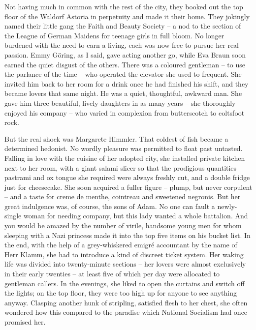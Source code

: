 Not having much in common with the rest of the city, they booked out the top floor of the Waldorf Astoria in perpetuity and made it their home. They jokingly named their little gang the Faith and Beauty Society -- a nod to the section of the League of German Maidens for teenage girls in full bloom. No longer burdened with the need to earn a living, each was now free to pursue her real passion. Emmy G\"oring, as I said, gave acting another go, while Eva Braun soon earned the quiet disgust of the others. There was a coloured gentleman -- to use the parlance of the time -- who operated the elevator she used to frequent. She invited him back to her room for a drink once he had finished his shift, and they became lovers that same night. He was a quiet, thoughtful, awkward man. She gave him three beautiful, lively daughters in as many years -- she thoroughly enjoyed his company -- who varied in complexion from butterscotch to coltsfoot rock.

But the real shock was Margarete Himmler. That coldest of fish became a determined hedonist. No wordly pleasure was permitted to float past untasted. Falling in love with the cuisine of her adopted city, she installed private kitchen next to her room, with a giant salami slicer so that the prodigious quantities pastrami and ox tongue she required were always freshly cut, and a double fridge just for cheesecake. She soon acquired a fuller figure -- plump, but never corpulent -- and a taste for creme de menthe, cointreau and sweetened negronis. But her great indulgence was, of course, the sons of Adam. No one can fault a newly-single woman for needing company, but this lady wanted a whole battalion. And you would be amazed by the number of virile, handsome young men for whom sleeping with a Nazi princess made it into the top five items on his bucket list. In the end, with the help of a grey-whiskered emigr\'e accountant by the name of Herr Klamm, she had to introduce a kind of discreet ticket system. Her waking life was divided into twenty-minute sections -- her lovers were almost exclusively in their early twenties -- at least five of which per day were allocated to gentleman callers. In the evenings, she liked to open the curtains and switch off the lights; on the top floor, they were too high up for anyone to see anything anyway. Clasping another hunk of stripling, satisfied flesh to her chest, she often wondered how this compared to the paradise which National Socialism had once promised her.

